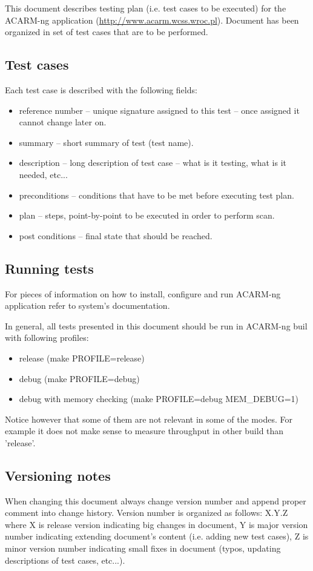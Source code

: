 This document describes testing plan (i.e. test cases to be executed) for the ACARM-ng application
(\url{http://www.acarm.wcss.wroc.pl}). Document has been organized in set of test cases that are to be performed.



\subsection{Test cases}
Each test case is described with the following fields:
\begin{itemize}
  \item reference number -- unique signature assigned to this test -- once assigned it cannot change later on.
  \item summary -- short summary of test (test name).
  \item description -- long description of test case -- what is it testing, what is it needed, etc...
  \item preconditions -- conditions that have to be met before executing test plan.
  \item plan -- steps, point-by-point to be executed in order to perform scan.
  \item post conditions -- final state that should be reached.
\end{itemize}



\subsection{Running tests}
For pieces of information on how to install, configure and run ACARM-ng application refer to system's documentation.

In general, all tests presented in this document should be run in ACARM-ng buil with following profiles:
\begin{itemize}
\item release (make PROFILE=release)
\item debug (make PROFILE=debug)
\item debug with memory checking (make PROFILE=debug MEM\_DEBUG=1)
\end{itemize}
Notice however that some of them are not relevant in some of the modes. For example it does not make sense
to measure throughput in other build than 'release'.



\subsection{Versioning notes}
When changing this document always change version number and append proper comment into change history.
Version number is organized as follows: X.Y.Z where X is release version indicating big changes in document,
Y is major version number indicating extending document's content (i.e. adding new test cases), Z is minor
version number indicating small fixes in document (typos, updating descriptions of test cases, etc...).
